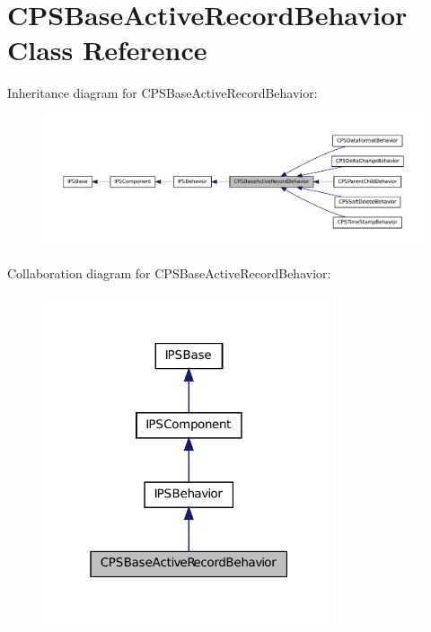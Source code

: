\hypertarget{classCPSBaseActiveRecordBehavior}{
\section{CPSBaseActiveRecordBehavior Class Reference}
\label{classCPSBaseActiveRecordBehavior}
}


Inheritance diagram for CPSBaseActiveRecordBehavior:\nopagebreak
\begin{figure}[H]
\begin{center}
\leavevmode
\includegraphics[width=400pt]{classCPSBaseActiveRecordBehavior__inherit__graph}
\end{center}
\end{figure}


Collaboration diagram for CPSBaseActiveRecordBehavior:\nopagebreak
\begin{figure}[H]
\begin{center}
\leavevmode
\includegraphics[width=244pt]{classCPSBaseActiveRecordBehavior__coll__graph}
\end{center}
\end{figure}
